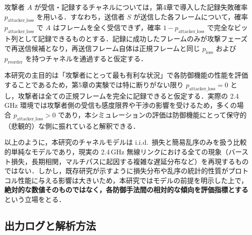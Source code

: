 \documentclass[twocolumn,10pt,a4paper]{jsarticle}
\begin{document}
攻撃者 $A$ が受信・記録するチャネルについては，第4章で導入した記録失敗確率 $p_{\mathrm{attacker\_loss}}$ を用いる．すなわち，送信者 $S$ が送信した各フレームについて，確率 $p_{\mathrm{attacker\_loss}}$ で $A$ はフレームを全く受信できず，確率 $1 - p_{\mathrm{attacker\_loss}}$ で完全なビット列として記録できるものとする．記録に成功したフレームのみが攻撃フェーズで再送信候補となり，再送信フレーム自体は正規フレームと同じ $p_{\mathrm{loss}}$ および $p_{\mathrm{reorder}}$ を持つチャネルを通過すると仮定する．

本研究の主目的は「攻撃者にとって最も有利な状況」で各防御機能の性能を評価することであるため，第5章の実験では特に断りがない限り $p_{\mathrm{attacker\_loss}} = 0$ とし，攻撃者は全ての正規フレームを完全に記録できると仮定する．実際の 2.4\,GHz 環境では攻撃者側の受信も感度限界や干渉の影響を受けるため，多くの場合 $p_{\mathrm{attacker\_loss}} > 0$ であり，本シミュレーションの評価は防御機能にとって保守的（悲観的）な側に振れていると解釈できる．

以上のように，本研究のチャネルモデルは i.i.d.\ 損失と簡易乱序のみを扱う比較的単純なモデルであり，現実の 2.4\,GHz 無線リンクにおける全ての現象（バースト損失，長期相関，マルチパスに起因する複雑な遅延分布など）を再現するものではない．しかし，既存研究が示すように損失分布や乱序の統計的性質がプロトコル性能に与える影響は大きい\cite{Neumann2005FEC,Hasslinger2008GE}ため，本研究ではモデルの前提を明示した上で，\textbf{絶対的な数値そのものではなく，各防御手法間の相対的な傾向を評価指標とする}という立場をとる．

\subsection{出力ログと解析方法}
\end{document}
